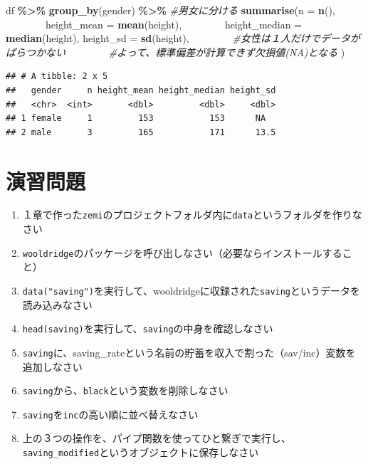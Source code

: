 \documentclass[
]{book}
\newenvironment{Shaded}{\begin{snugshade}}{\end{snugshade}}
\newcommand{\AttributeTok}[1]{\textcolor[rgb]{0.13,0.29,0.53}{#1}}
\newcommand{\CommentTok}[1]{\textcolor[rgb]{0.56,0.35,0.01}{\textit{#1}}}
\newcommand{\FunctionTok}[1]{\textcolor[rgb]{0.13,0.29,0.53}{\textbf{#1}}}
\newcommand{\NormalTok}[1]{#1}
\newcommand{\SpecialCharTok}[1]{\textcolor[rgb]{0.81,0.36,0.00}{\textbf{#1}}}
\providecommand{\tightlist}{%
  \setlength{\itemsep}{0pt}\setlength{\parskip}{0pt}}
\begin{document}
\begin{Shaded}
\begin{Highlighting}[]
\NormalTok{df }\SpecialCharTok{\%\textgreater{}\%}
  \FunctionTok{group\_by}\NormalTok{(gender) }\SpecialCharTok{\%\textgreater{}\%} \CommentTok{\#男女に分ける}
  \FunctionTok{summarise}\NormalTok{(}\AttributeTok{n =} \FunctionTok{n}\NormalTok{(),}
    　　　　\AttributeTok{height\_mean =} \FunctionTok{mean}\NormalTok{(height),}
    　　　　\AttributeTok{height\_median =} \FunctionTok{median}\NormalTok{(height),}
            \AttributeTok{height\_sd =} \FunctionTok{sd}\NormalTok{(height), }
    　　　　\CommentTok{\#女性は１人だけでデータがばらつかない}
    　　　　\CommentTok{\#よって、標準偏差が計算できず欠損値(NA)となる}
\NormalTok{            ) }
\end{Highlighting}
\end{Shaded}

\begin{verbatim}
## # A tibble: 2 x 5
##   gender     n height_mean height_median height_sd
##   <chr>  <int>       <dbl>         <dbl>     <dbl>
## 1 female     1         153           153      NA  
## 2 male       3         165           171      13.5
\end{verbatim}

\hypertarget{ux6f14ux7fd2ux554fux984c-4}{%
\section{演習問題}\label{ux6f14ux7fd2ux554fux984c-4}}

\begin{enumerate}
\def\labelenumi{\arabic{enumi}.}
\tightlist
\item
  １章で作った\texttt{zemi}のプロジェクトフォルダ内に\texttt{data}というフォルダを作りなさい\\
\item
  \texttt{wooldridge}のパッケージを呼び出しなさい（必要ならインストールすること）\\
\item
  \texttt{data("saving")}を実行して、wooldridgeに収録された\texttt{saving}というデータを読み込みなさい
\item
  \texttt{head(saving)}を実行して、\texttt{saving}の中身を確認しなさい
\item
  \texttt{saving}に、saving\_rateという名前の貯蓄を収入で割った（sav/inc）変数を追加しなさい
\item
  \texttt{saving}から、\texttt{black}という変数を削除しなさい
\item
  \texttt{saving}を\texttt{inc}の高い順に並べ替えなさい
\item
  上の３つの操作を、パイプ関数を使ってひと繋ぎで実行し、\texttt{saving\_modified}というオブジェクトに保存しなさい
\end{enumerate}

  
\end{document}
